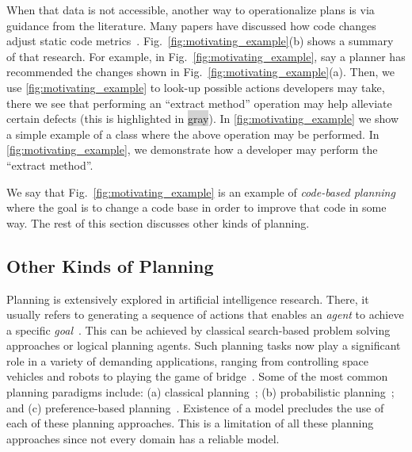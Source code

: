 \documentclass[10pt, journal, compsoc]{IEEEtran}
\newcommand{\fig}[1]{Fig.~\ref{fig:#1}}
\begin{document}
When that data is not accessible, another way to operationalize plans is via 
 guidance from the literature. Many papers have
discussed how code changes adjust
static code metrics~\cite{stroggylos2007, du2006study, kataoka2002, bryton2009, elish2011, elish2012}.
\fig{motivating_example}(b) shows a summary of
that research. 
For example, in \fig{motivating_example}, say a planner has recommended the changes shown in \fig{motivating_example}(a). Then, we use \ref{fig:motivating_example}\protect{} to look-up possible actions developers may take, there we see that performing an ``extract method'' operation may help alleviate certain defects (this is highlighted in {\colorbox{lightgray}{gray}}). In \ref{fig:motivating_example}\protect{} we show a simple example of a class where the above operation may be performed. In \ref{fig:motivating_example}\protect{}, we demonstrate how a developer may perform the ``extract method''. 


 
 We say that \fig{motivating_example} is an example of {\em code-based planning} where the goal is to change a code base in order to improve that code in some way.
 The rest of this section discusses other kinds of planning.

\subsection{Other Kinds of Planning}
\label{sect:planners}
Planning is extensively explored in artificial intelligence research. There, it usually refers to generating a sequence of actions that enables an \textit{agent} to achieve a specific \textit{goal}~\cite{norvig}. This can be achieved by classical search-based problem solving approaches or logical planning agents. Such planning tasks now play a significant role in a variety of demanding applications, ranging from controlling space vehicles and robots to playing the game of bridge~\cite{ghallab04}. Some of the most common planning paradigms include: (a) classical planning~\cite{wooldridge95}; (b) probabilistic planning~\cite{Bel, altman99, guo2009}; and (c) preference-based planning~\cite{son06, baier09}. Existence of a model precludes the use of each of these planning approaches. This is a limitation of all these planning approaches since not every domain has a reliable model. 
\end{document}
